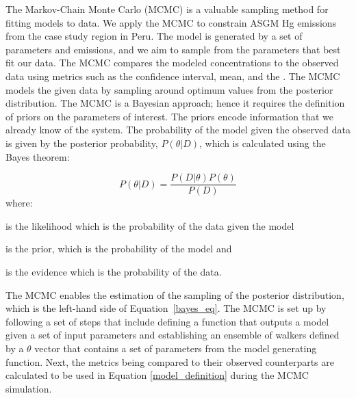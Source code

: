 \begin{flushleft}
The Markov-Chain Monte Carlo (MCMC) is a valuable sampling method for fitting models to data\cite{hogg_data_2018}. We apply the MCMC to constrain ASGM Hg emissions from the case study region in Peru.  The model is generated by a set of parameters and emissions, and we aim to sample from the parameters that best fit our data. The MCMC compares the modeled concentrations to the observed data using metrics such as the \nft confidence interval, mean, and the \iq. The MCMC models the given data by sampling around optimum values from the posterior distribution. The MCMC is a Bayesian approach; hence it requires the definition of priors on the parameters of interest. The priors encode information that we already know of the system. The probability of the model given the observed data is given by the posterior probability, $P(\theta|D)$, which is calculated using the Bayes theorem:

\begin{equation}
\label{bayes_eq}
P(\theta|D)=\frac{P(D|\theta)P(\theta)}{P(D)}
\end{equation}
where:
\end{flushleft}

\begin{description}[leftmargin=!,labelwidth={3 em}]
    \item [$P(D|\theta)$] is the likelihood which is the probability of the data given the model
    \item [$P(\theta)$] is the prior, which is the probability of the model and 
    \item [$P(D)$] is the evidence which is the probability of the data.
\end{description}

\begin{flushleft}
The MCMC enables the estimation of the sampling of the posterior distribution, which is the left-hand side of Equation~\ref{bayes_eq}. The MCMC is set up by following a set of steps that include defining a function that outputs a model given a set of input parameters and establishing an ensemble of walkers defined by a $\theta$ vector that contains a set of parameters from the model generating function.
Next, the metrics being compared to their observed counterparts are calculated to be used in Equation \ref{model_definition} during the MCMC simulation. 
\end{flushleft}



